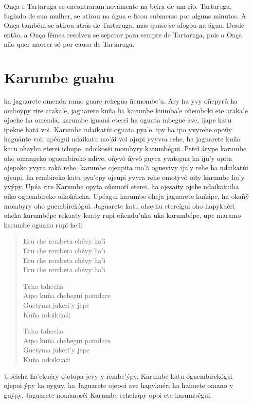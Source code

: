 Onça e Tartaruga se encontraram novamente na beira de um rio. Tartaruga, fugindo de sua mulher, se atirou na água e ficou submerso por alguns minutos. A Onça também se atirou atrás de Tartaruga, mas quase se afogou na água.
Desde então, a Onça fêmea resolveu se separar para sempre de Tartaruga,
pois a Onça não quer morrer só por causa de Tartaruga.

\chapter{Karumbe guahu}

 ha jaguarete omenda ramo guare rehegua ñemombe'u. Ary ha yvy
oñepyrũ ha omboypy rire araka'e, jaguarete kuña ha karumbe kuimba'e
oñemboki ete araka'e ojoehe ha omenda, karumbe iguaná eterei ha oguata
mbegue ave, ijape katu ipekue hatã voi. Karumbe ndaikatúi oguata pya'e,
ipy ha ipo yvyrehe opoñy haguánte voi; upéagui ndaikatu mo'ãi voi ojupi
yvyvra rehe, ha jaguarete kuña katu ohayhu eterei ichupe, ndoikoséi
mombyry karumbégui. Peteĩ árype karumbe oho omangeko oguembireko ndive,
oñyvõ ñyvõ guyra yvategua ha iju'y opita ojepoko yvyra rakã rehe,
karumbe ojeupita mo'ã oguevivy iju'y rehe ha ndaikatúi ojeupi, ha
rembireko katu pya'epy ojeupi yvyra rehe omotyvõ oity karumbe hu'y
yvýpy. Upéa rire Karumbe opyta oñemotĩ eterei, ha ojesaity ojehe
ndaikatuiha oiko oguembireko oikoháicha. Upéagui karumbe oheja jaguarete
kuñápe, ha okañỹ mombyry oho guembirekógui. Jaguarete katu ohayhu
etereígui oho hapykuéri oheka karumbépe rekuaty kuaty rupi oñendu'uka
uka karumbépe, upe maramo karumbe oguahu rupi he'i:

\begin{verse}
Eru che rembeta chévy ha'i\\
Eru che rembeta chévy ha'i\\
Eru che rembeta chévy ha'i\\
Eru che rembeta chévy ha'i

\pagebreak       
Taha tahecha\\
Aipo kuña chehegui poindare\\
Guetyma jukeri'y jepe\\
Kuña ndoikuaái
       
Taha tahecha\\
Aipo kuña chehegui poindare\\
Guetyma jukeri'y jepe\\
Kuña ndoikuaái
\end{verse}


Upéicha ha'ekuéry ojotopa jevy y rembe'ýpy, Karumbe katu oguembirekógui 
ojepoi ýpy ha oyguy, ha Jaguarete ojepoi ave hapykuéri ha haimete omano
y guýpy, Jaguarete nomanoséi Karumbe rehehápy opoi ete karumbégui.

